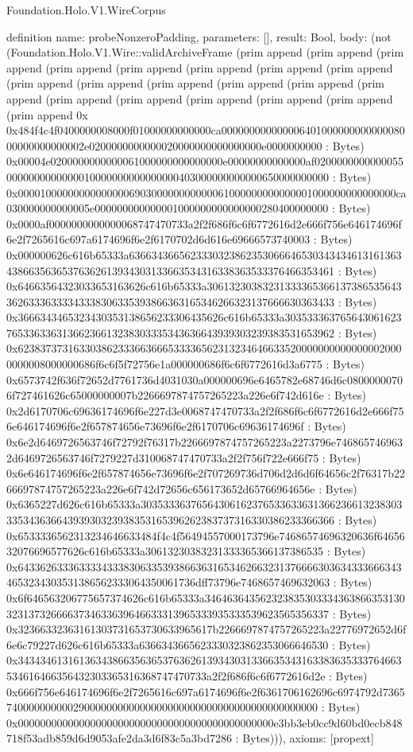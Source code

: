 \begin{lexlean}{Foundation.Holo.V1.WireCorpus}
\begin{semanticmodule}
definition{
  name: probeNonzeroPadding,
  parameters: [],
  result: Bool,
  body: (not (Foundation.Holo.V1.Wire::validArchiveFrame (prim append (prim append (prim append (prim append (prim append (prim append (prim append (prim append (prim append (prim append (prim append (prim append (prim append (prim append (prim append (prim append (prim append (prim append (prim append (prim append 0x 0x484f4c4f0400000008000f01000000000000ca00000000000000640100000000000008000000000000002e0200000000000020000000000000000e0000000000 : Bytes) 0x00004e0200000000000061000000000000000e00000000000000af02000000000000550000000000000010000000000000000403000000000000650000000000 : Bytes) 0x00001000000000000000690300000000000061000000000000001000000000000000ca030000000000005e000000000000001000000000000000280400000000 : Bytes) 0x0000af0000000000000068747470733a2f2f686f6c6f6772616d2e666f756e646174696f6e2f7265616c697a6174696f6e2f6170702d6d616e69666573740003 : Bytes) 0x000000626c616b65333a636634366562333032386235306664653034343461316136343866356365376362613934303133663534316338363533376466353461 : Bytes) 0x64663564323033653163626c616b65333a3061323038323133336536613738653564336263336333343338306335393866363165346266323137666630363433 : Bytes) 0x3666343465323430353138656233306435626c616b65333a30353336376564306162376533633631366236613238303335343636643939303239383531653962 : Bytes) 0x6238373731633038623336636665333365623132346466335200000000000000020000000008000000686f6c6f5f72756e1a000000686f6c6f6772616d3a6775 : Bytes) 0x6573742f636f72652d7761736d4031030a000000696e6465782e68746d6c08000000706f727461626c65000000007b2266697874757265223a226e6f742d616e : Bytes) 0x2d6170706c69636174696f6e227d3e0068747470733a2f2f686f6c6f6772616d2e666f756e646174696f6e2f657874656e73696f6e2f6170706c69636174696f : Bytes) 0x6e2d6469726563746f72792f76317b2266697874757265223a2273796e7468657469632d6469726563746f7279227d310068747470733a2f2f756f722e666f75 : Bytes) 0x6e646174696f6e2f657874656e73696f6e2f707269736d706d2d6d6f64656c2f76317b2266697874757265223a226e6f742d72656c656173652d65766964656e : Bytes) 0x6365227d626c616b65333a3035333637656430616237653363363136623661323830333534363664393930323938353165396262383737316330386233366366 : Bytes) 0x6533336562313234646633484f4c4f56494557000173796e74686574696320636f6465632076696577626c616b65333a30613230383231333365366137386535 : Bytes) 0x6433626333633334333830633539386636316534626632313766663036343336663434653234303531386562333064350061736dff73796e7468657469632063 : Bytes) 0x6f646563206775657374626c616b65333a3464636435623238353033343638663531303231373266663734633639646633313965333935333539623565356337 : Bytes) 0x32366332363161303731653730633965617b2266697874757265223a22776972652d6f6e6c79227d626c616b65333a6366343665623330323862353066646530 : Bytes) 0x343434613161363438663563653763626139343031336635343163383635333764663534616466356432303365316368747470733a2f2f686f6c6f6772616d2e : Bytes) 0x666f756e646174696f6e2f7265616c697a6174696f6e2f6361706162696c6974792d736574000000000029000000000000000000000000000000000000000000 : Bytes) 0x0000000000000000000000000000000000000000000000e3bb3eb0cc9d60bd0ecb848718f53adb859d6d9053afe2da3d6f83c5a3bd7286 : Bytes))),
  axioms: [propext]
}


\end{semanticmodule}
\end{lexlean}
